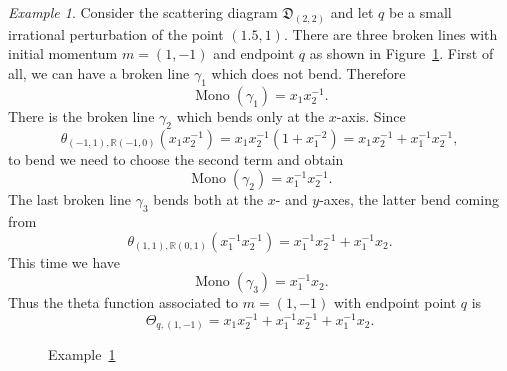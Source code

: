 \documentclass[11pt]{amsart}
\theoremstyle{remark}
\newtheorem{example}[theorem]{Example}
\numberwithin{equation}{section}
\newcommand{\RR}{\mathbb{R}}
\newcommand{\fD}{\mathfrak{D}}
\newcommand{\Mono}{\operatorname{Mono}}
\begin{document}
\begin{example} 
  \label{brokenex}
  Consider the scattering diagram $\fD_{(2,2)}$ and let $q$ be a small
  irrational perturbation of the point $(1.5,1)$. There are three broken lines
  with initial momentum $m = (1,-1)$ and endpoint $q$ as shown in
  Figure~\ref{figbrokenex}.
  First of all, we can have a broken line $\gamma_1$ which does not bend.
  Therefore
  \[
    \Mono(\gamma_1) = x_1 x_2^{-1}.
  \]
  There is the broken line $\gamma_2$  which bends only at the $x$-axis. Since
  \[ 
    \theta_{(-1,1), \RR(-1,0)} (x_1 x_2^{-1}) = 
    x_1 x_2^{-1}(1+x_1^{-2}) =  x_1 x_2^{-1} + x_1^{-1} x_2^{-1},
  \]
  to bend we need to choose the second term and obtain 
  \[
    \Mono(\gamma_2) =  x_1^{-1} x_2^{-1}.
  \]
  The last broken line $\gamma_3$ bends both at the $x$- and $y$-axes, the
  latter bend coming from
  \[ 
    \theta_{ (1,1), \RR (0,1)} ( x_1^{-1} x_2^{-1}) =  
    x_1^{-1} x_2^{-1} + x_1^{-1} x_2.  
  \]
  This time we have 
  \[
    \Mono (\gamma_3) = x_1^{-1} x_2.
  \]
  Thus the theta function associated to $m = (1,-1)$ with endpoint point $q$ is 
  \[ 
    \Theta_{q, (1,-1)} =  
    x_1 x_2^{-1} + x_1^{-1} x_2^{-1} +x_1^{-1} x_2 .  
  \]
\end{example}

\begin{figure}
  \centering
  \caption{Example~\ref{brokenex}} 
  \label{figbrokenex}
\end{figure}
\end{document}
